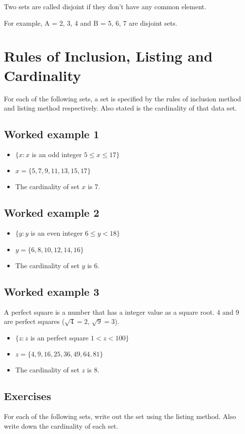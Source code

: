 \documentclass[a4paper,12pt]{article}
\begin{document}
Two sets are called disjoint if they don't have any common element.

For example, A = {2, 3, 4} and B = {5, 6, 7} are disjoint sets.

\section*{Rules of Inclusion, Listing and Cardinality}
For each of the following sets, a set is specified by the rules of inclusion method and listing method respectively. Also stated is the cardinality of that data set.
\subsection*{Worked example 1}
\begin{itemize}
\item $\{ x : x $ is an odd integer $ 5 \leq x \leq 17 \}$
\item $x = \{5,7,9,11,13,15,17\}$
\item The cardinality of set $x$ is 7.
\end{itemize}

\subsection*{Worked example 2}
\begin{itemize}
\item $\{ y : y $ is an even integer $ 6 \leq y < 18 \}$
\item $y = \{6,8,10,12,14,16\}$
\item The cardinality of set $y$ is 6.
\end{itemize}

\subsection*{Worked example 3}
A perfect square is a number that has a integer value as a
square root. 4 and 9 are perfect squares ($\sqrt{4} = 2$,
$\sqrt{9} = 3$).
\begin{itemize}
\item $\{ z : z $ is an perfect square $ 1 < z < 100 \}$
\item $z = \{4,9,16,25,36,49,64,81\}$
\item The cardinality of set $z$ is 8.
\end{itemize}


\subsection*{Exercises}
For each of the following sets, write out the set using the listing method.
Also write down the cardinality of each set.
\end{document}

